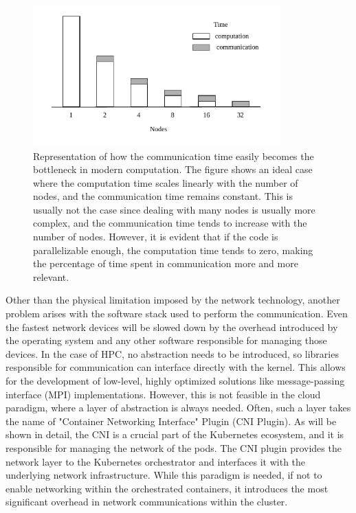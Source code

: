 \begin{figure}[h]
  \centering
  \includegraphics[width=0.85\textwidth]{img/chpt2/scaling}
  \caption{Representation of how the communication time easily becomes the
    bottleneck in modern computation. The figure shows an ideal case where
    the computation time scales linearly with the number of nodes, and the
    communication time remains constant.
    This is usually not the case since dealing with many nodes is usually more
    complex, and the communication time tends to increase with the number of
    nodes.
    However, it is evident that if the code is parallelizable enough, the
    computation time tends to zero, making the percentage of time spent in
    communication more and more relevant.}
  \label{fig:scaling}
\end{figure}

Other than the physical limitation imposed by the network technology, another
problem arises with the software stack used to perform the communication.
Even the fastest network devices will be slowed down by the overhead introduced
by the operating system and any other software responsible for managing those
devices.
In the case of HPC, no abstraction needs to be introduced, so libraries
responsible for communication can interface directly with the kernel.
This allows for the development of low-level, highly optimized solutions like
message-passing interface (MPI) implementations.
However, this is not feasible in the cloud paradigm, where a layer of
abstraction is always needed.
Often, such a layer takes the name of "Container Networking Interface" Plugin (CNI
Plugin).
As will be shown in detail, the CNI is a crucial part of the Kubernetes
ecosystem, and it is responsible for managing the network of the pods.
The CNI plugin provides the network layer to the Kubernetes orchestrator and
interfaces it with the underlying network infrastructure.
While this paradigm is needed, if not to enable networking within the
orchestrated containers, it introduces the most significant overhead in network
communications within the cluster.

